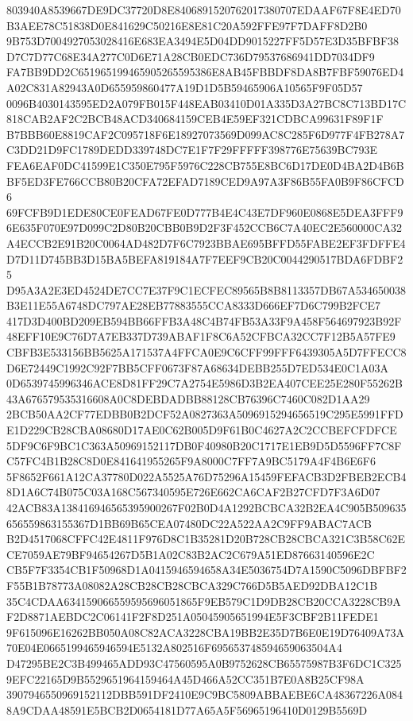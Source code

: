 \documentclass[UTF8,fontset=fandol,zihao=-4,a4paper]{ctexart}
\begin{document}
{{803940A8539667DE9DC37720D8E8406891520762017380707EDAAF67F8E4ED70B3AEE78C51838D0E841629C50216E8E81C20A592FFE97F7DAFF8D2B0
9B753D7004927053028416E683EA3494E5D04DD9015227FF5D57E3D35BFBF38D7C7D77C68E34A277C0D6E71A28CB0EDC736D79537686941DD7034DF9
FA7BB9DD2C651965199465905265595386E8AB45FBBDF8DA8B7FBF59076ED4A02C831A82943A0D655959860477A19D1D5B59465906A10565F9F05D57
0096B4030143595ED2A079FB015F448EAB03410D01A335D3A27BC8C713BD17C818CAB2AF2C2BCB48ACD340684159CEB4E59EF321CDBCA99631F89F1F
B7BBB60E8819CAF2C095718F6E18927073569D099AC8C285F6D977F4FB278A7C3DD21D9FC1789DEDD339748DC7E1F7F29FFFFF398776E75639BC793E
FEA6EAF0DC41599E1C350E795F5976C228CB755E8BC6D17DE0D4BA2D4B6BBF5ED3FE766CCB80B20CFA72EFAD7189CED9A97A3F86B55FA0B9F86CFCD6
69FCFB9D1EDE80CE0FEAD67FE0D777B4E4C43E7DF960E0868E5DEA3FFF96E635F070E97D099C2D80B20CBB0B9D2F3F452CCB6C7A40EC2E560000CA32
A4ECCB2E91B20C0064AD482D7F6C7923BBAE695BFFD55FABE2EF3FDFFE4D7D11D745BB3D15BA5BEFA819184A7F7EEF9CB20C0044290517BDA6FDBF25
D95A3A2E3ED4524DE7CC7E37F9C1ECFEC89565B8B8113357DB67A534650038B3E11E55A6748DC797AE28EB77883555CCA8333D666EF7D6C799B2FCE7
417D3D400BD209EB594BB66FFB3A48C4B74FB53A33F9A458F564697923B92F48EFF10E9C76D7A7EB337D739ABAF1F8C6A52CFBCA32CC7F12B5A57FE9
CBFB3E533156BB5625A171537A4FFCA0E9C6CFF99FFF6439305A5D7FFECC8D6E72449C1992C92F7BB5CFF0673F87A68634DEBB255D7ED534E0C1A03A
0D6539745996346ACE8D81FF29C7A2754E5986D3B2EA407CEE25E280F55262B43A676579535316608A0C8DEBDADBB88128CB76396C7460C082D1AA29
2BCB50AA2CF77EDBB0B2DCF52A0827363A5096915294656519C295E5991FFDE1D229CB28CBA08680D17AE0C62B005D9F61B0C4627A2C2CCBEFCFDFCE
5DF9C6F9BC1C363A50969152117DB0F40980B20C1717E1EB9D5D5596FF7C8FC57FC4B1B28C8D0E841641955265F9A8000C7FF7A9BC5179A4F4B6E6F6
5F8652F661A12CA37780D022A5525A76D75296A15459FEFACB3D2FBEB2ECB48D1A6C74B075C03A168C567340595E726E662CA6CAF2B27CFD7F3A6D07
42ACB83A138416946565395900267F02B0D4A1292BCBCA32B2EA4C905B509635656559863155367D1BB69B65CEA07480DC22A522AA2C9FF9ABAC7ACB
B2D4517068CFFC42E4811F976D8C1B35281D20B728CB28CBCA321C3B58C62ECE7059AE79BF94654267D5B1A02C83B2AC2C679A51ED87663140596E2C
CB5F7F3354CB1F50968D1A0415946594658A34E5036754D7A1590C5096DBFBF2F55B1B78773A08082A28CB28CB28CBCA329C766D5B5AED92DBA12C1B
35C4CDAA634159066559595696051865F9EB579C1D9DB28CB20CCA3228CB9AF2D8871AEBDC2C06141F2F8D251A05045905651994E5F3CBF2B11FEDE1
9F615096E16262BB050A08C82ACA3228CBA19BB2E35D7B6E0E19D76409A73A70E04E0665199465946594E5132A802516F695653748594659063504A4
D47295BE2C3B499465ADD93C47560595A0B9752628CB65575987B3F6DC1C3259EFC22165D9B5529651964159464A45D466A52CC351B7E0A8B25CF98A
3907946550969152112DBB591DF2410E9C9BC5809ABBAEBE6CA48367226A0848A9CDAA48591E5BCB2D0654181D77A65A5F56965196410D0129B5569D
}}
\end{document}

